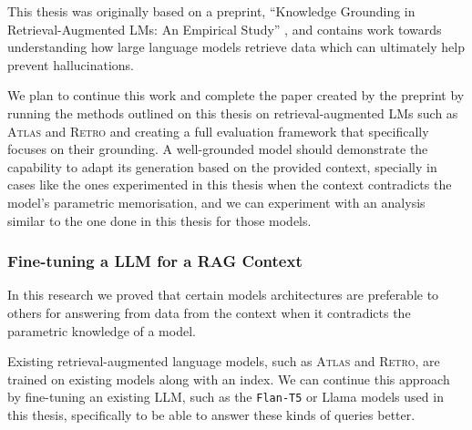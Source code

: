 This thesis was originally based on a preprint, ``Knowledge Grounding in Retrieval-Augmented LMs: An Empirical Study'' \citep{knowledge_grounding_retrieval_augmented}, and contains work towards understanding how large language models retrieve data which can ultimately help prevent hallucinations.

We plan to continue this work and complete the paper created by the preprint by running the methods outlined on this thesis on retrieval-augmented LMs such as \textsc{Atlas} \citep{atlas_foundational} and \textsc{Retro} \citep{retro} and creating a full evaluation framework that specifically focuses on their grounding.
A well-grounded model should demonstrate the capability to adapt its generation based on the provided context, specially in cases like the ones experimented in this thesis when the context contradicts the model's parametric memorisation, and we can experiment with an analysis similar to the one done in this thesis for those models.

\subsubsection{Fine-tuning a LLM for a RAG Context}

In this research we proved that certain models architectures are preferable to others for answering from data from the context when it contradicts the parametric knowledge of a model.

Existing retrieval-augmented language models, such as \textsc{Atlas} and \textsc{Retro}, are trained on existing models along with an index.
We can continue this approach by fine-tuning an existing LLM, such as the \texttt{Flan-T5} or Llama models used in this thesis, specifically to be able to answer these kinds of queries better.
